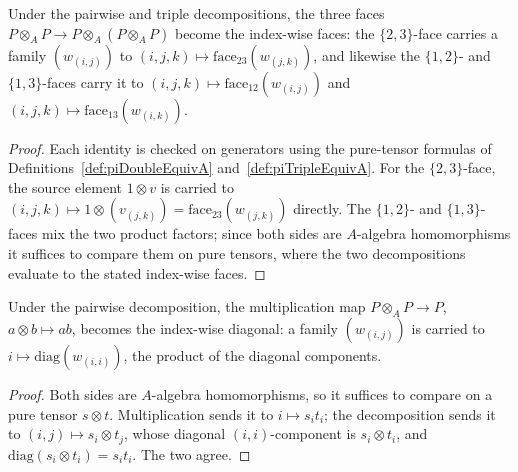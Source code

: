 \begin{lemma}
  \label{lem:descentFace_transport}
  \leanok
  Under the pairwise and triple decompositions, the three faces \(P \otimes_A P \to
  P \otimes_A (P \otimes_A P)\) become the index-wise faces: the \(\{2,3\}\)-face carries a
  family \((w_{(i,j)})\) to \((i,j,k) \mapsto \mathrm{face}_{23}(w_{(j,k)})\), and likewise the
  \(\{1,2\}\)- and \(\{1,3\}\)-faces carry it to
  \((i,j,k) \mapsto \mathrm{face}_{12}(w_{(i,j)})\) and
  \((i,j,k) \mapsto \mathrm{face}_{13}(w_{(i,k)})\).
\end{lemma}
\begin{proof}
  \leanok
  Each identity is checked on generators using the pure-tensor formulas of
  Definitions~\ref{def:piDoubleEquivA} and~\ref{def:piTripleEquivA}. For the \(\{2,3\}\)-face,
  the source element \(1 \otimes v\) is carried to
  \((i,j,k) \mapsto 1 \otimes (v_{(j,k)}) = \mathrm{face}_{23}(w_{(j,k)})\) directly. The
  \(\{1,2\}\)- and \(\{1,3\}\)-faces mix the two product factors; since both sides are
  \(A\)-algebra homomorphisms it suffices to compare them on pure tensors, where the two
  decompositions evaluate to the stated index-wise faces.
\end{proof}

\begin{lemma}
  \label{lem:lmul_transport}
  \leanok
  Under the pairwise decomposition, the multiplication map \(P \otimes_A P \to P\),
  \(a \otimes b \mapsto ab\), becomes the index-wise diagonal: a family \((w_{(i,j)})\) is
  carried to \(i \mapsto \mathrm{diag}(w_{(i,i)})\), the product of the diagonal components.
\end{lemma}
\begin{proof}
  \leanok
  Both sides are \(A\)-algebra homomorphisms, so it suffices to compare on a pure tensor
  \(s \otimes t\). Multiplication sends it to \(i \mapsto s_i t_i\); the decomposition sends it
  to \((i,j) \mapsto s_i \otimes t_j\), whose diagonal \((i,i)\)-component is \(s_i \otimes t_i\),
  and \(\mathrm{diag}(s_i \otimes t_i) = s_i t_i\). The two agree.
\end{proof}

